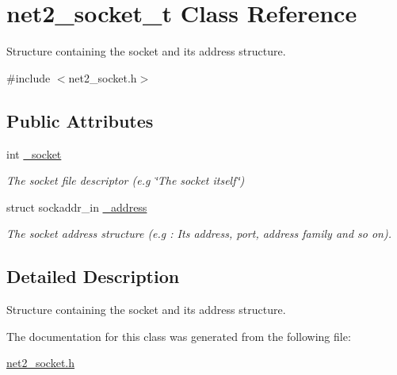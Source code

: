 \hypertarget{structnet2__socket__t}{\section{net2\-\_\-socket\-\_\-t Class Reference}
\label{structnet2__socket__t}
}


Structure containing the socket and its address structure.  




{\ttfamily \#include $<$net2\-\_\-socket.\-h$>$}

\subsection*{Public Attributes}
\begin{DoxyCompactItemize}
\item 
\hypertarget{structnet2__socket__t_a605421383ca1720f2f46dbc19b4fd101}{int \hyperlink{structnet2__socket__t_a605421383ca1720f2f46dbc19b4fd101}{\-\_\-socket}}\label{structnet2__socket__t_a605421383ca1720f2f46dbc19b4fd101}

\begin{DoxyCompactList}\small\item\em The socket file descriptor (e.\-g \char`\"{}\-The socket itself\char`\"{}) \end{DoxyCompactList}\item 
\hypertarget{structnet2__socket__t_a6527b2540e35955db1187ddee8b75877}{struct sockaddr\-\_\-in \hyperlink{structnet2__socket__t_a6527b2540e35955db1187ddee8b75877}{\-\_\-address}}\label{structnet2__socket__t_a6527b2540e35955db1187ddee8b75877}

\begin{DoxyCompactList}\small\item\em The socket address structure (e.\-g \-: Its address, port, address family and so on). \end{DoxyCompactList}\end{DoxyCompactItemize}


\subsection{Detailed Description}
Structure containing the socket and its address structure. 

The documentation for this class was generated from the following file\-:\begin{DoxyCompactItemize}
\item 
\hyperlink{net2__socket_8h}{net2\-\_\-socket.\-h}\end{DoxyCompactItemize}
